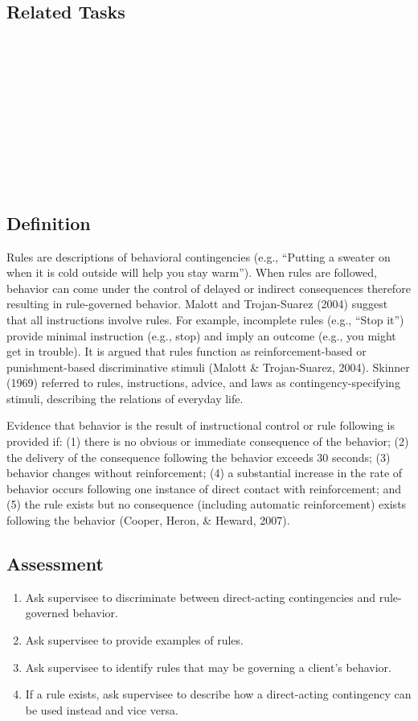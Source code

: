 \subsection{Related Tasks}
\fourdEight{}\\
\foureOne{}\\
\foureThree{}\\
\foureThirteen{}\\
\fourjEleven{}\\
\fourFKEleven{}\\
\fourFKTwentyFour{}\\
\fourFKTwentyFive{}\\
\fourFKThirtyFive{}\\
%
%
%
\section{\foureThree{}}
\subsection{Definition}
Rules are descriptions of behavioral contingencies (e.g., ``Putting a sweater on when it is cold outside will help you stay warm'').  When rules are followed, behavior can come under the control of delayed or indirect consequences therefore resulting in rule-governed behavior.  Malott and Trojan-Suarez (2004) suggest that all instructions involve rules.  For example, incomplete rules (e.g., ``Stop it'') provide minimal instruction (e.g., stop) and imply an outcome (e.g., you might get in trouble).   It is argued that rules function as reinforcement-based or punishment-based discriminative stimuli (Malott \& Trojan-Suarez, 2004). Skinner (1969) referred to rules, instructions, advice, and laws as contingency-specifying stimuli, describing the  relations of everyday life.

Evidence that behavior is the result of instructional control or rule following is provided if: (1) there is no obvious or immediate consequence of the behavior; (2) the delivery of the consequence following the behavior exceeds 30 seconds; (3) behavior changes without reinforcement; (4) a substantial increase in the rate of behavior occurs following one instance of direct contact with reinforcement; and (5) the rule exists but no consequence (including automatic reinforcement) exists following the behavior (Cooper, Heron, \& Heward, 2007).
%
\subsection{Assessment}
\begin{enumerate}
\item Ask supervisee to discriminate between direct-acting contingencies and rule-governed behavior.
\item Ask supervisee to provide examples of rules.
\item Ask supervisee to identify rules that may be governing a client's behavior.
\item If a rule exists, ask supervisee to describe how a direct-acting contingency can be used instead and vice versa.
\end{enumerate}
%
